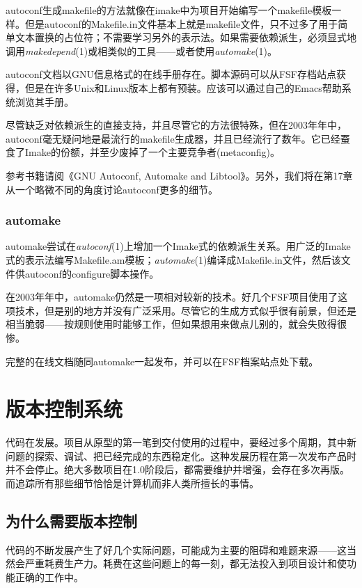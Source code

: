 \documentclass[12pt,oneside]{book}
\begin{document}
\begin{common-format}
autoconf生成makefile的方法就像在imake中为项目开始编写一个makefile模板一样。但是autoconf的Makefile.in文件基本上就是makefile文件，只不过多了用于简单文本置换的占位符；不需要学习另外的表示法。如果需要依赖派生，必须显式地调用\textit{makedepend}(1)或相类似的工具——或者使用\textit{automake}(1)。

autoconf文档以GNU信息格式的在线手册存在。脚本源码可以从FSF存档站点获得，但是在许多Unix和Linux版本上都有预装。应该可以通过自己的Emacs帮助系统浏览其手册。

尽管缺乏对依赖派生的直接支持，并且尽管它的方法很特殊，但在2003年年中，autoconf毫无疑问地是最流行的makefile生成器，并且已经流行了数年。它已经蚕食了Imake的份额，并至少废掉了一个主要竞争者(metaconfig)。

参考书籍请阅《GNU Autoconf, Automake and Libtool\cite{Vaughan}》。另外，我们将在第17章从一个略微不同的角度讨论autoconf更多的细节。

\subsubsection{automake}
automake尝试在\textit{autoconf}(1)上增加一个Imake式的依赖派生关系。用广泛的Imake式的表示法编写Makefile.am模板；\textit{automake}(1)编译成Makefile.in文件，然后该文件供autoconf的configure脚本操作。

在2003年年中，automake仍然是一项相对较新的技术。好几个FSF项目使用了这项技术，但是别的地方并没有广泛采用。尽管它的生成方式似乎很有前景，但还是相当脆弱——按规则使用时能够工作，但如果想用来做点儿别的，就会失败得很惨。

完整的在线文档随同automake一起发布，并可以在FSF档案站点处下载。

\section{版本控制系统}
代码在发展。项目从原型的第一笔到交付使用的过程中，要经过多个周期，其中新问题的探索、调试、把已经完成的东西稳定化。这种发展历程在第一次发布产品时并不会停止。绝大多数项目在1.0阶段后，都需要维护并增强，会存在多次再版。而追踪所有那些细节恰恰是计算机而非人类所擅长的事情。

\subsection{为什么需要版本控制}
代码的不断发展产生了好几个实际问题，可能成为主要的阻碍和难题来源——这当然会严重耗费生产力。耗费在这些问题上的每一刻，都无法投入到项目设计和使功能正确的工作中。


\end{common-format}
\end{document}
